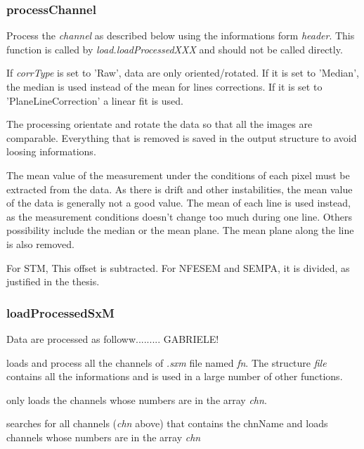 \subsubsection{processChannel}

\bdf
{} Process the \emph{channel} as described below using the informations form \emph{header}. This function is called by \emph{load.loadProcessedXXX} and should not be called directly.

 If \emph{corrType} is set to 'Raw', data are only oriented/rotated. If it is set to 'Median', the median is used instead of the mean for lines corrections. If it is set to 'PlaneLineCorrection' a linear fit is used. 
\edf

The processing orientate and rotate the data so that all the images are comparable.
Everything that is removed is saved in the output structure to avoid loosing informations.

The mean value of the measurement under the conditions of each pixel must be extracted from the data. As there is drift and other instabilities, the mean value of the data is generally not a good value. The mean of each line is used instead, as the measurement conditions doesn't change too much during one line. Others possibility include the median or the mean plane. The mean plane along the line is also removed.

For STM, This offset is subtracted. For NFESEM and SEMPA, it is divided, as justified in the thesis.

\subsubsection{loadProcessedSxM}

Data are processed as followw......... GABRIELE!

\bdf
{} loads and process all the channels of \emph{.sxm} file named \emph{fn}. The structure \emph{file} contains all the informations and is used in a large number of other functions.

 only loads the channels whose numbers are in the array \emph{chn}.

 searches for all channels (\emph{chn} above) that contains the chnName and loads channels whose numbers are in the array \emph{chn}

